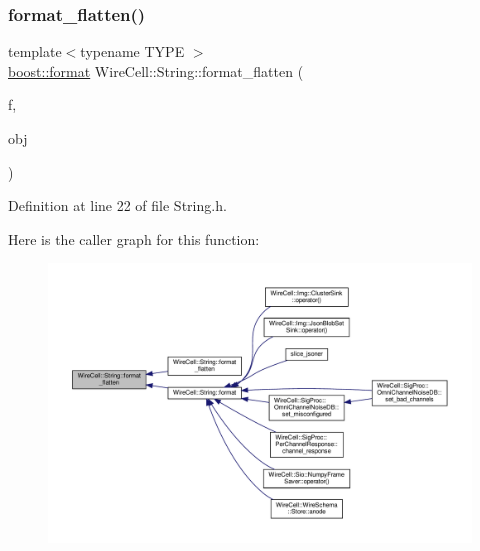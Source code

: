\subsubsection{\texorpdfstring{format\+\_\+flatten()}{format\_flatten()}\hspace{0.1cm}{\footnotesize\ttfamily [1/3]}}
{\footnotesize\ttfamily template$<$typename T\+Y\+PE $>$ \\
\hyperlink{locale_8h_a4d9ddd9260f49d99308d41580d169bd2}{boost\+::format} Wire\+Cell\+::\+String\+::format\+\_\+flatten (\begin{DoxyParamCaption}\item[{\hyperlink{locale_8h_a4d9ddd9260f49d99308d41580d169bd2}{boost\+::format}}]{f,  }\item[{T\+Y\+PE}]{obj }\end{DoxyParamCaption})}



Definition at line 22 of file String.\+h.

Here is the caller graph for this function\+:
\nopagebreak
\begin{figure}[H]
\begin{center}
\leavevmode
\includegraphics[width=350pt]{namespace_wire_cell_1_1_string_a483dc976ea784d91bef184a893e9bba8_icgraph}
\end{center}
\end{figure}
\mbox{\label{namespace_wire_cell_1_1_string_acaae0ff0fab063552147e1e59cec4e00}} 
